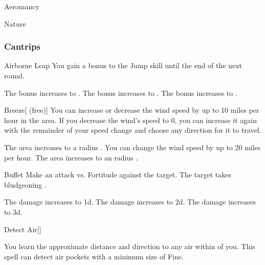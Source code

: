 
\begin{spellsection}{Aeromancy}

\begin{spellheader}
\end{spellheader}


 Nature

\subsubsection{Cantrips}


\begin{freeability}{Airborne Leap}
You gain a  bonus to the Jump skill until the end of the next round.

\rankline
{} The bonus increases to .
 The bonus increases to .
 The bonus increases to .
\end{freeability}


\begin{freeability}{Breeze}[ (free)]
You can increase or decrease the wind speed by up to 10 miles per hour in the area.
If you decrease the wind's speed to 0, you can increase it again with the remainder of your speed change and choose any direction for it to travel.

\rankline
{} The area increases to a \areahuge radius .
 You can change the wind speed by up to 20 miles per hour.
 The area increases to an \areaext radius .
\end{freeability}


\begin{freeability}{Buffet}
Make an attack vs. Fortitude against the target.
\hit The target takes bludgeoning .

\rankline
{} The damage increases to  \plus1d.
 The damage increases to  \plus2d.
 The damage increases to  \plus3d.
\end{freeability}


\begin{freeability}{Detect Air}[]

You learn the approximate distance and direction to any air within \rnglong {} of you.
This spell can detect air pockets with a minimum size of Fine.


\end{freeability}
\end{spellsection}
